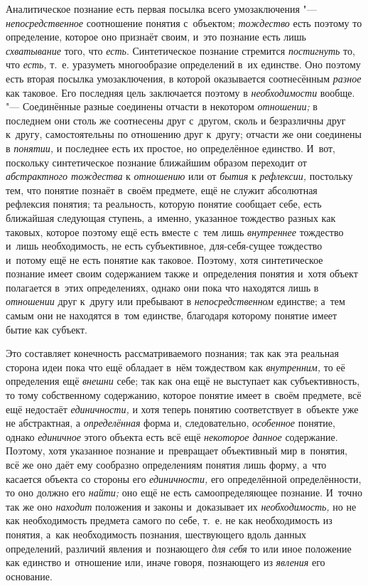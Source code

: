 
Аналитическое познание есть первая посылка всего
умозаключения "--- {\em непосредственное}
соотношение понятия с~объектом;
{\em тождество} есть
поэтому то определение, которое оно признаёт своим, и~это познание есть
лишь {\em схватывание}
того, что {\em есть}.
Синтетическое познание стремится
{\em постигнуть} то, что
{\em есть,} т.~е.
уразуметь многообразие определений в~их единстве. Оно поэтому есть вторая
посылка умозаключения, в
которой
оказывается соотнесённым
{\em разное} как таковое.
Его последняя цель заключается поэтому в
{\em необходимости}
вообще. "--- Соединённые разные соединены отчасти
в некотором {\em отношении;}
в последнем они столь же соотнесены друг с~другом, сколь и
безразличны друг к~другу, самостоятельны по отношению друг к~другу; отчасти
же они соединены в {\em понятии,}
и последнее есть их простое, но определённое единство. И~вот,
поскольку синтетическое познание ближайшим образом переходит от
{\em абстрактного тождества}
к {\em отношению}
или от {\em бытия}
к {\em рефлексии,}
постольку тем, что понятие познаёт в~своём предмете, ещё не
служит абсолютная рефлексия понятия; та реальность, которую понятие
сообщает себе, есть ближайшая следующая ступень, а~именно, указанное
тождество разных как таковых, которое поэтому ещё есть вместе с~тем лишь
{\em внутреннее}
тождество и~лишь необходимость, не есть субъективное,
для-себя-сущее тождество и~потому ещё не есть понятие как таковое. Поэтому,
хотя синтетическое познание имеет своим содержанием также и~определения
понятия и~хотя объект полагается в~этих определениях, однако они пока что
находятся лишь в {\em отношении}
друг к~другу или пребывают в
{\em непосредственном}
единстве; а~тем самым они не находятся в~том единстве,
благодаря которому понятие имеет бытие как субъект.

Это составляет конечность рассматриваемого познания; так как
эта реальная сторона идеи пока что ещё обладает в~нём тождеством как
{\em внутренним,} то её
определения ещё {\em внешни}
себе; так как она ещё не выступает как субъективность, то
тому собственному содержанию, которое понятие имеет в~своём предмете, всё
ещё недостаёт {\em единичности,}
и хотя теперь понятию соответствует в~объекте уже не
абстрактная, а {\em определённая}
форма и, следовательно,
{\em особенное} понятие,
однако {\em единичное}
этого объекта есть всё ещё
{\em некоторое данное}
содержание. Поэтому, хотя указанное познание и~превращает
объективный мир в~понятия, всё же оно даёт ему сообразно
определениям понятия лишь форму, а~что касается объекта со стороны его
{\em единичности,} его
определённой определённости, то оно должно его
{\em найти;} оно ещё не
есть самоопределяющее познание. И~точно так же оно
{\em находит} положения и
законы и~доказывает их
{\em необходимость,} но
не как необходимость предмета самого по себе, т.~е. не как необходимость из
понятия, а~как необходимость познания, шествующего вдоль данных
определений, различий явления и~познающего
{\em для себя} то или
иное положение как единство и~отношение или, иначе говоря, познающего из
{\em явления} его
основание.

